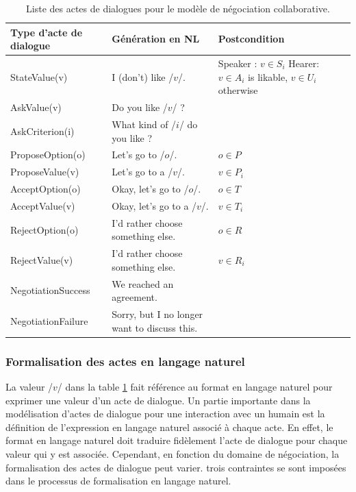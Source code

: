 				\begin{table}[t]
					\centering
					\begin{tabular} {|p{3.25cm}|p{6cm}|p{3.25cm}|}
						\hline
						\textbf{Type d'acte de dialogue}  &\textbf{ Génération en NL} & \textbf{Postcondition}\\
						\hline
						StateValue(v) &  I (don't) like /$v$/. & Speaker : $v \in S_i$ \newline Hearer:  \newline $v\in A_i$ is likable, $v\in U_i$ otherwise \\
						\hline
						AskValue(v)& Do you like /$v$/ ? & \multirow{2}{*}{} \\
						
						AskCriterion(i) &  What kind of /$i$/ do you like ? & \\
						\hline
						ProposeOption(o)  & Let's go to /$o$/. & $o \in P$\\
						
						ProposeValue(v) & Let's go to a /$v$/. & $v \in P_i$\\
						\hline
						AcceptOption(o)& Okay, let's go to /$o$/.& $o \in T$ \\
						
						AcceptValue(v) & Okay, let's go to a /$v$/.& $v \in T_i$ \\
						\hline
						RejectOption(o) & I'd rather choose  something else. & $o \in R$\\
						
						RejectValue(v) &  I'd rather choose  something else. & $v \in R_i$ \\
						\hline
						NegotiationSuccess &  We reached an agreement. & \multirow{2}{*}{}\\
						\cline{1-2}
						NegotiationFailure &  Sorry, but I no longer want to discuss this. & \\
						\hline
					\end{tabular}
					
					\caption{\label{table:utt}Liste des actes de dialogues pour le modèle de négociation collaborative.}
				\end{table}
				
		\subsubsection{Formalisation des actes en langage naturel}
		\label{sec:formalisation}
			La valeur /$v$/ dans la table \ref{table:utt} fait référence au format en langage naturel pour exprimer une valeur d'un acte de dialogue.
			Un partie importante dans la modélisation d'actes de dialogue pour une interaction avec un humain est la définition de l'expression en langage naturel associé à chaque acte. En effet, le format en langage naturel doit traduire fidèlement l'acte de dialogue pour chaque valeur qui y est associée.
			Cependant, en fonction du domaine de négociation, la formalisation des actes de dialogue peut varier. trois contraintes se sont imposées dans le processus de formalisation en langage naturel. 
			
